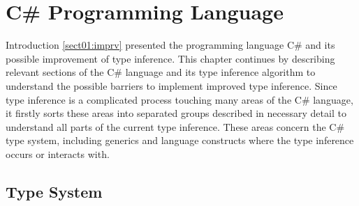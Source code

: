 \chapter{C\# Programming Language}

Introduction \ref{sect01:imprv} presented the programming language C\# and its possible improvement of type inference. 
This chapter continues by describing relevant sections of the C\# language and its type inference algorithm to understand the possible barriers to implement improved type inference. 
Since type inference is a complicated process touching many areas of the C\# language, it firstly sorts these areas into separated groups described in necessary detail to understand all parts of the current type inference. 
These areas concern the C\# type system, including generics and language constructs where the type inference occurs or interacts with.

\section{Type System}

